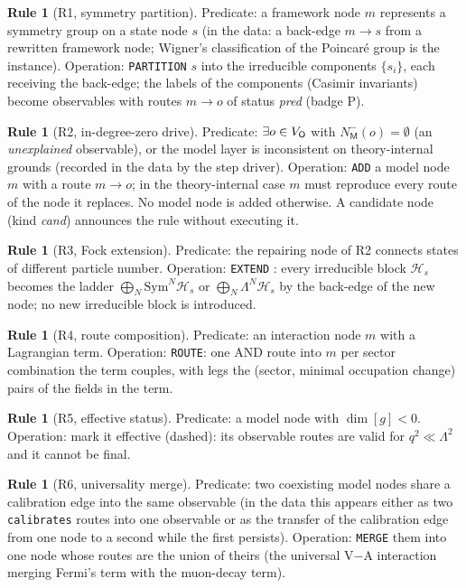 \documentclass[11pt,a4paper,twoside,openany]{report}
\theoremstyle{plain}
\theoremstyle{definition}
\newtheorem{rule_}[theorem]{Rule}
\theoremstyle{remark}
\newcommand{\lay}[1]{\mathsf{#1}}
\newcommand{\id}[1]{\texttt{#1}}
\newcommand{\op}[1]{\texttt{\MakeUppercase{#1}}}
\begin{document}
\begin{rule_}[R1, symmetry partition]
Predicate: a framework node $m$ represents a symmetry group on a state node $s$ (in the data: a back-edge $m\to s$ from a rewritten framework node; Wigner's classification of the Poincar\'e group \citep{wigner1939} is the instance). Operation: \op{partition} $s$ into the irreducible components $\{s_i\}$, each receiving the back-edge; the labels of the components (Casimir invariants) become observables with routes $m\to o$ of status \emph{pred} (badge P).
\end{rule_}
\begin{rule_}[R2, in-degree-zero drive]
Predicate: $\exists o\in\VO$ with $N^-_{\lay M}(o)=\emptyset$ (an \emph{unexplained} observable), or the model layer is inconsistent on theory-internal grounds (recorded in the data by the step driver). Operation: \op{add} a model node $m$ with a route $m\to o$; in the theory-internal case $m$ must reproduce every route of the node it replaces. No model node is added otherwise. A candidate node (kind \emph{cand}) announces the rule without executing it.
\end{rule_}
\begin{rule_}[R3, Fock extension]
Predicate: the repairing node of R2 connects states of different particle number. Operation: \op{extend} \citep{fock1932,weinberg1995}: every irreducible block $\mathcal H_s$ becomes the ladder $\bigoplus_N \mathrm{Sym}^N\mathcal H_s$ or $\bigoplus_N\Lambda^N\mathcal H_s$ by the back-edge of the new node; no new irreducible block is introduced.
\end{rule_}
\begin{rule_}[R4, route composition]
Predicate: an interaction node $m$ with a Lagrangian term. Operation: \op{route}: one AND route into $m$ per sector combination the term couples, with legs the (sector, minimal occupation change) pairs of the fields in the term.
\end{rule_}
\begin{rule_}[R5, effective status]
Predicate: a model node with $\dim[g]<0$. Operation: mark it effective (dashed): its observable routes are valid for $q^2\ll\Lambda^2$ and it cannot be final.
\end{rule_}
\begin{rule_}[R6, universality merge]
Predicate: two coexisting model nodes share a calibration edge into the same observable (in the data this appears either as two \id{calibrates} routes into one observable or as the transfer of the calibration edge from one node to a second while the first persists). Operation: \op{merge} them into one node whose routes are the union of theirs (the universal V$-$A interaction \citep{feynman_gellmann1958,sudarshan_marshak1958} merging Fermi's term \citep{fermi1934} with the muon-decay term).
\end{rule_}
\end{document}
